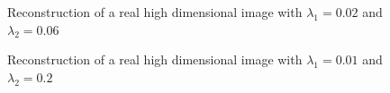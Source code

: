 \documentclass[a4paper,11pt,oneside]{report}
\theoremstyle{named}
\begin{document}
\begin{figure}
    \centering
    \caption{Reconstruction of a real high dimensional image with $\lambda_1 = 0.02$ and $\lambda_2 = 0.06$}
    \label{fig:h8}
\end{figure}

\begin{figure}
    \centering
    \caption{Reconstruction of a real high dimensional image with $\lambda_1 = 0.01$ and $\lambda_2 = 0.2$}
    \label{fig:h6}
\end{figure}
\end{document}
